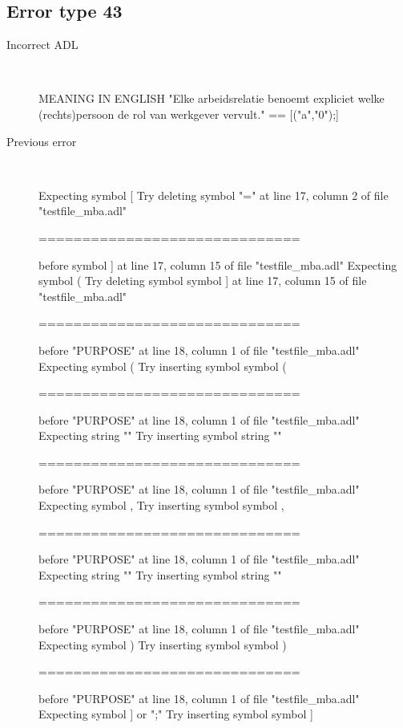 \subsection{Error type 43}
  \begin{description}
  \item[Incorrect ADL]~\\
\begin{adl}
MEANING IN ENGLISH "Elke arbeidsrelatie benoemt expliciet welke (rechts)persoon de rol van werkgever vervult."
== [("a","0");]     \end{adl}
  \item[Previous error]~\\
\begin{haskell}
Expecting symbol [
Try deleting symbol "=" at line 17, column 2 of file "testfile_mba.adl"

==============================

before symbol ] at line 17, column 15 of file "testfile_mba.adl"
Expecting symbol (
Try deleting symbol symbol ] at line 17, column 15 of file "testfile_mba.adl"

==============================

before "PURPOSE" at line 18, column 1 of file "testfile_mba.adl"
Expecting symbol (
Try inserting symbol symbol (

==============================

before "PURPOSE" at line 18, column 1 of file "testfile_mba.adl"
Expecting string ""
Try inserting symbol string ""

==============================

before "PURPOSE" at line 18, column 1 of file "testfile_mba.adl"
Expecting symbol ,
Try inserting symbol symbol ,

==============================

before "PURPOSE" at line 18, column 1 of file "testfile_mba.adl"
Expecting string ""
Try inserting symbol string ""

==============================

before "PURPOSE" at line 18, column 1 of file "testfile_mba.adl"
Expecting symbol )
Try inserting symbol symbol )

==============================

before "PURPOSE" at line 18, column 1 of file "testfile_mba.adl"
Expecting symbol ] or ";"
Try inserting symbol symbol ]


\end{haskell}
\end{description}

